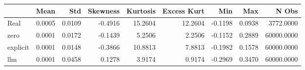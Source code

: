 \begin{tabular}{lrrrrrrrr}
\toprule
 & Mean & Std & Skewness & Kurtosis & Excess Kurt & Min & Max & N Obs \\
\midrule
Real & 0.0005 & 0.0109 & -0.4916 & 15.2604 & 12.2604 & -0.1198 & 0.0938 & 3772.0000 \\
zero & 0.0001 & 0.0172 & -0.1439 & 5.2506 & 2.2506 & -0.1152 & 0.2889 & 60000.0000 \\
explicit & 0.0001 & 0.0148 & -0.3866 & 10.8813 & 7.8813 & -0.1982 & 0.1578 & 60000.0000 \\
llm & 0.0001 & 0.0458 & 0.1278 & 3.9174 & 0.9174 & -0.2969 & 0.3470 & 60000.0000 \\
\bottomrule
\end{tabular}
